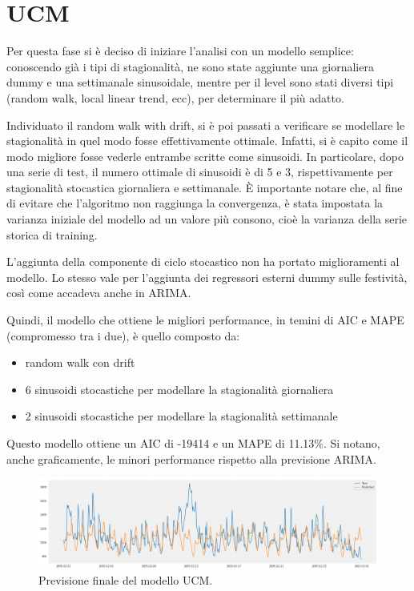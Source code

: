 
\section{UCM}

Per questa fase si è deciso di iniziare l’analisi con un modello semplice: conoscendo già i tipi di stagionalità, ne sono state aggiunte una giornaliera dummy e una settimanale sinusoidale, mentre per il level sono stati diversi tipi (random walk, local linear trend, ecc), per determinare il più adatto. 

Individuato il random walk with drift, si è poi passati a verificare se modellare le stagionalità in quel modo fosse effettivamente ottimale. Infatti, si è capito come il modo migliore fosse vederle entrambe scritte come sinusoidi. In particolare, dopo una serie di test, il numero ottimale di sinusoidi è di 5 e 3, rispettivamente per stagionalità stocastica giornaliera e settimanale. È importante notare che, al fine di evitare che l'algoritmo non raggiunga la convergenza, è stata impostata la varianza iniziale del modello ad un valore più consono, cioè la varianza della serie storica di training. 

L'aggiunta della componente di ciclo stocastico non ha portato miglioramenti al modello. Lo stesso vale per l'aggiunta dei regressori esterni dummy sulle festività, così come accadeva anche in ARIMA. 

Quindi, il modello che ottiene le migliori performance, in temini di AIC e MAPE (compromesso tra i due), è quello composto da:
\begin{itemize}
    \item random walk con drift
    \item 6 sinusoidi stocastiche per modellare la stagionalità giornaliera
    \item 2 sinusoidi stocastiche per modellare la stagionalità settimanale
\end{itemize}

Questo modello ottiene un AIC di -19414 e un MAPE di 11.13\%. Si notano, anche graficamente, le minori performance rispetto alla previsione ARIMA. 

\begin{figure}[H]
\centering
\includegraphics[width=14cm]{Pictures/prediction_ucm.png}
\caption{Previsione finale del modello UCM.}
\end{figure}

